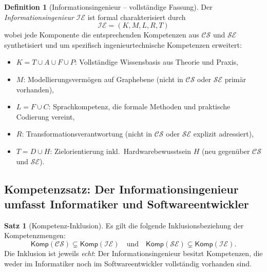 ﻿\documentclass[a4paper,12pt]{report}
\theoremstyle{definition}
\newtheorem{definition}{Definition}[section]
\newtheorem{satz}{Satz}[section]
\begin{document}
\begin{definition}[Informationsingenieur -- vollständige Fassung]
\label{def:infeng2}
Der \emph{Informationsingenieur} $\mathcal{IE}$ ist formal charakterisiert durch
\[
  \mathcal{IE} = (K, M, L, R, T)
\]
wobei jede Komponente die entsprechenden Kompetenzen aus $\mathcal{CS}$ und
$\mathcal{SE}$ synthetisiert und um spezifisch ingenieurtechnische Kompetenzen erweitert:
\begin{itemize}
  \item $K = T \cup A \cup F \cup P$: Vollständige Wissensbasis aus Theorie und Praxis,
  \item $M$: Modellierungsvermögen auf Graphebene (nicht in $\mathcal{CS}$ oder $\mathcal{SE}$
        primär vorhanden),
  \item $L = F \cup C$: Sprachkompetenz, die formale Methoden und praktische Codierung vereint,
  \item $R$: Transformationsverantwortung (nicht in $\mathcal{CS}$ oder $\mathcal{SE}$
        explizit adressiert),
  \item $T = D \cup H$: Zielorientierung inkl.\ Hardwarebewusstsein $H$ (neu gegenüber $\mathcal{CS}$
        und $\mathcal{SE}$).
\end{itemize}
\end{definition}

\subsection{Kompetenzsatz: Der Informationsingenieur umfasst Informatiker und Softwareentwickler}

\begin{satz}[Kompetenz-Inklusion]
\label{satz:inklusion}
Es gilt die folgende Inklusionsbeziehung der Kompetenzmengen:
\[
  \mathsf{Komp}(\mathcal{CS}) \subsetneq \mathsf{Komp}(\mathcal{IE})
  \quad \text{und} \quad
  \mathsf{Komp}(\mathcal{SE}) \subsetneq \mathsf{Komp}(\mathcal{IE}).
\]
Die Inklusion ist jeweils \emph{echt}: Der Informationsingenieur besitzt Kompetenzen,
die weder im Informatiker noch im Softwareentwickler vollständig vorhanden sind.
\end{satz}
\end{document}
